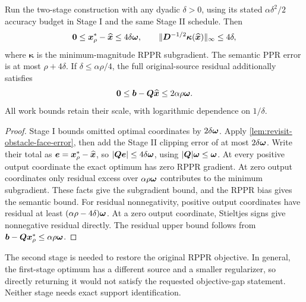 \begin{corollary}
\label{cor:revisit-general-residual}
Run the two-stage construction with any dyadic $\delta>0$, using its
stated $\alpha\delta^2/2$ accuracy budget in Stage I and the same Stage II
schedule. Then
\[
 \bm{0}\leq\bm{x}_\rho^*-\widehat{\bm{x}}\leq4\delta\bm{\omega},
 \qquad
 \|\bm{D}^{-1/2}\bm{\kappa}(\widehat{\bm{x}})\|_\infty\leq4\delta,
\]
where $\bm{\kappa}$ is the minimum-magnitude RPPR subgradient.
The semantic PPR error is at most $\rho+4\delta$.
If $\delta\leq\alpha\rho/4$, the full original-source residual additionally
satisfies
\[
 \bm{0}\leq\bm{b}-\bm{Q}\widehat{\bm{x}}\leq2\alpha\rho\bm{\omega}.
\]
All work bounds retain their scale, with logarithmic dependence on
$1/\delta$.
\end{corollary}
\begin{proof}
Stage I bounds omitted optimal coordinates by $2\delta\bm{\omega}$.
Apply \cref{lem:revisit-obstacle-face-error}, then add the Stage II clipping
error of at most $2\delta\bm{\omega}$. Write their total as
$\bm{e}=\bm{x}_\rho^*-\widehat{\bm{x}}$, so
$|\bm{Q}\bm{e}|\leq4\delta\bm{\omega}$, using $|\bm{Q}|\bm{\omega}\leq\bm{\omega}$.
At every positive output coordinate the exact optimum has zero RPPR
gradient. At zero output coordinates only residual excess over
$\alpha\rho\bm{\omega}$ contributes to the minimum subgradient. These facts
give the subgradient bound, and the RPPR bias gives the semantic bound.
For residual nonnegativity, positive output coordinates have residual at
least $(\alpha\rho-4\delta)\bm{\omega}$. At a zero output coordinate,
Stieltjes signs give nonnegative residual directly. The residual upper
bound follows from $\bm{b}-\bm{Q}\bm{x}_\rho^*\leq\alpha\rho\bm{\omega}$.
\end{proof}

The second stage is needed to restore the original RPPR objective. In
general, the first-stage optimum has a different source and a smaller
regularizer, so directly returning it would not satisfy the requested
objective-gap statement. Neither stage needs exact support identification.
